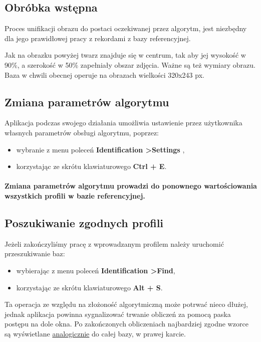 \documentclass[]{article}
\begin{document}
\subsection{Obróbka wstępna}
Proces unifikacji obrazu do postaci oczekiwanej przez algorytm, jest niezbędny dla jego prawidłowej pracy z rekordami z bazy referencyjnej.
\begin{center}
\end{center}
Jak na obrazku powyżej twarz znajduje się w centrum, tak aby jej wysokość w 90\%, a szerokość w 50\% zapełniały obszar zdjęcia. Ważne są też wymiary obrazu. Baza w chwili obecnej operuje na obrazach wielkości 320x243 px.

\subsection{Zmiana parametrów algorytmu}
Aplikacja podczas swojego działania umożliwia ustawienie przez użytkownika własnych parametrów obsługi algorytmu, poprzez:
\begin{itemize}
	\item wybranie z menu poleceń \textbf{Identification \textgreater \space Settings	},
	\item korzystając ze skrótu klawiaturowego \textbf{Ctrl + E}.
\end{itemize}

\paragraph*{Zmiana parametrów algorytmu prowadzi do ponownego wartościowania wszystkich profili w bazie referencyjnej.}

\subsection{Poszukiwanie zgodnych profili}
Jeżeli zakończyliśmy pracę z wprowadzanym profilem należy uruchomić przeszukiwanie baz:
\begin{itemize}
	\item wybierając z menu poleceń \textbf{Identification \textgreater \space Find},
	\item korzystając ze skrótu klawiaturowego \textbf{Alt + S}.
\end{itemize}
Ta operacja ze względu na złożoność algorytmiczną może potrwać nieco dłużej, jednak aplikacja powinna sygnalizować trwanie obliczeń za pomocą paska postępu na dole okna. Po zakończonych obliczeniach najbardziej zgodne wzorce są wyświetlane \hyperref[sec:view]{analogicznie} do całej bazy, w prawej karcie.
\end{document}
